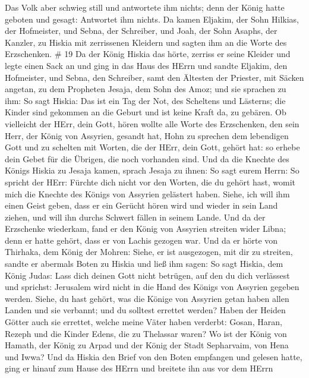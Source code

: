  Das Volk aber schwieg still und antwortete ihm nichts;
denn der König hatte geboten und gesagt: Antwortet ihm nichts.
 Da kamen Eljakim, der Sohn Hilkias, der Hofmeister, und
Sebna, der Schreiber, und Joah, der Sohn Asaphs, der Kanzler, zu Hiskia
mit zerrissenen Kleidern und sagten ihm an die Worte des Erzschenken. \#
19  Da der König Hiskia das hörte, zerriss er seine Kleider
und legte einen Sack an und ging in das Haus des HErrn  und
sandte Eljakim, den Hofmeister, und Sebna, den Schreiber, samt den
Ältesten der Priester, mit Säcken angetan, zu dem Propheten Jesaja, dem
Sohn des Amoz;  und sie sprachen zu ihm: So sagt Hiskia: Das
ist ein Tag der Not, des Scheltens und Lästerns; die Kinder sind
gekommen an die Geburt und ist keine Kraft da, zu gebären. 
Ob vielleicht der HErr, dein Gott, hören wollte alle Worte des
Erzschenken, den sein Herr, der König von Assyrien, gesandt hat, Hohn zu
sprechen dem lebendigen Gott und zu schelten mit Worten, die der HErr,
dein Gott, gehört hat: so erhebe dein Gebet für die Übrigen, die noch
vorhanden sind.  Und da die Knechte des Königs Hiskia zu
Jesaja kamen,  sprach Jesaja zu ihnen: So sagt eurem Herrn:
So spricht der HErr: Fürchte dich nicht vor den Worten, die du gehört
hast, womit mich die Knechte des Königs von Assyrien gelästert haben.
 Siehe, ich will ihm einen Geist geben, dass er ein Gerücht
hören wird und wieder in sein Land ziehen, und will ihn durchs Schwert
fällen in seinem Lande.  Und da der Erzschenke wiederkam,
fand er den König von Assyrien streiten wider Libna; denn er hatte
gehört, dass er von Lachis gezogen war.  Und da er hörte von
Thirhaka, dem König der Mohren: Siehe, er ist ausgezogen, mit dir zu
streiten, sandte er abermals Boten zu Hiskia und ließ ihm sagen:
 So sagt Hiskia, dem König Judas: Lass dich deinen Gott
nicht betrügen, auf den du dich verlässest und sprichst: Jerusalem wird
nicht in die Hand des Königs von Assyrien gegeben werden. 
Siehe, du hast gehört, was die Könige von Assyrien getan haben allen
Landen und sie verbannt; und du solltest errettet werden? 
Haben der Heiden Götter auch sie errettet, welche meine Väter haben
verderbt: Gosan, Haran, Rezeph und die Kinder Edens, die zu Thelassar
waren?  Wo ist der König von Hamath, der König zu Arpad und
der König der Stadt Sepharvaim, von Hena und Iwwa?  Und da
Hiskia den Brief von den Boten empfangen und gelesen hatte, ging er
hinauf zum Hause des HErrn und breitete ihn aus vor dem HErrn
